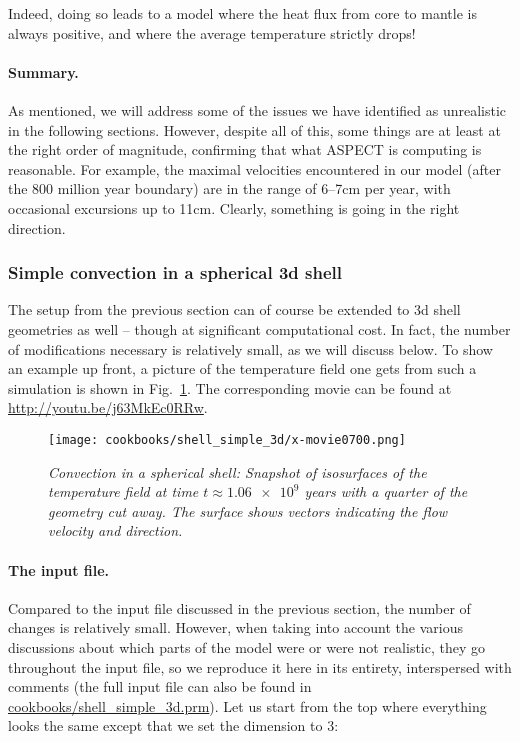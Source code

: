 \documentclass{article}
\newcommand{\aspect}{\textsc{ASPECT}}
\begin{document}
Indeed, doing so leads to a model where the heat flux from core to mantle is
always positive, and where the average temperature strictly drops!


\paragraph{Summary.} As mentioned, we will address some of the issues we have
identified as unrealistic in the following sections.
However, despite all of this, some things are at least at the right order of
magnitude, confirming that what \aspect{} is computing is reasonable. For
example, the maximal velocities encountered in our model (after the 800 million
year boundary) are in the range of 6--7cm per year, with occasional excursions
up to 11cm. Clearly, something is going in the right direction.


\subsubsection{Simple convection in a spherical 3d shell}
\label{sec:shell-simple-3d}

The setup from the previous section can of course be extended to 3d shell
geometries as well -- though at significant computational cost. In fact, the
number of modifications necessary is relatively small, as we will discuss below.
To show an example up front, a picture of the temperature field one gets from
such a simulation is shown in Fig.~\ref{fig:simple-shell-3d}. The
corresponding movie can be found at \url{http://youtu.be/j63MkEc0RRw}.

\begin{figure}[tb]
\centering
\texttt{[image: cookbooks/shell\_simple\_3d/x-movie0700.png]}
\caption{\it Convection in a spherical shell: Snapshot of
isosurfaces of the temperature field at time $t\approx \num{1.06e9}$ years
with a quarter of the geometry cut away. The surface shows
vectors indicating the flow velocity and direction.}
\label{fig:simple-shell-3d}
\end{figure}

\paragraph{The input file.}
Compared to the input file discussed in the previous section, the number of
changes is relatively small. However, when taking into account the various
discussions about which parts of the model were or were not realistic, they go
throughout the input file, so we reproduce it here in its entirety, interspersed
with comments (the full input file can also be found in
\url{cookbooks/shell_simple_3d.prm}). Let us start from the top where everything
looks the same except that we set the dimension to 3:
\end{document}
